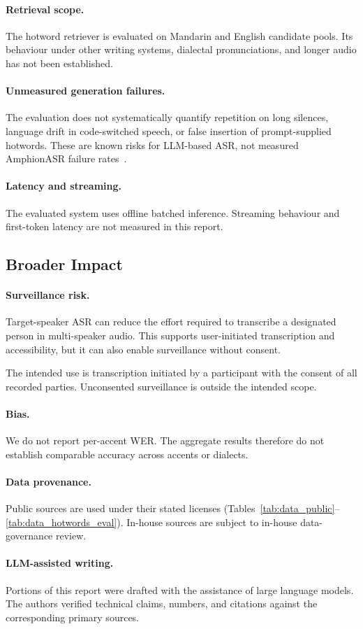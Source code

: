 \paragraph{Retrieval scope.}
The hotword retriever is evaluated on Mandarin and English candidate
pools.
Its behaviour under other writing systems, dialectal pronunciations,
and longer audio has not been established.

\paragraph{Unmeasured generation failures.}
The evaluation does not systematically quantify repetition on long
silences, language drift in code-switched speech, or false insertion of
prompt-supplied hotwords.
These are known risks for LLM-based ASR, not measured AmphionASR
failure rates~\cite{radford2023whisper,chu2023qwenaudio}.

\paragraph{Latency and streaming.}
The evaluated system uses offline batched inference.
Streaming behaviour and first-token latency are not measured in this
report.

\subsection{Broader Impact}

\paragraph{Surveillance risk.}
Target-speaker ASR can reduce the effort required to transcribe a
designated person in multi-speaker audio.
This supports user-initiated transcription and accessibility, but it
can also enable surveillance without consent.

The intended use is transcription initiated by a participant with the
consent of all recorded parties.
Unconsented surveillance is outside the intended scope.

\paragraph{Bias.}
We do not report per-accent WER.
The aggregate results therefore do not establish comparable accuracy
across accents or dialects.

\paragraph{Data provenance.}
Public sources are used under their stated licenses
(Tables~\ref{tab:data_public}--\ref{tab:data_hotwords_eval}).
In-house sources are subject to in-house data-governance review.

\paragraph{LLM-assisted writing.}
Portions of this report were drafted with the assistance of large
language models.
The authors verified technical claims, numbers, and citations against
the corresponding primary sources.
